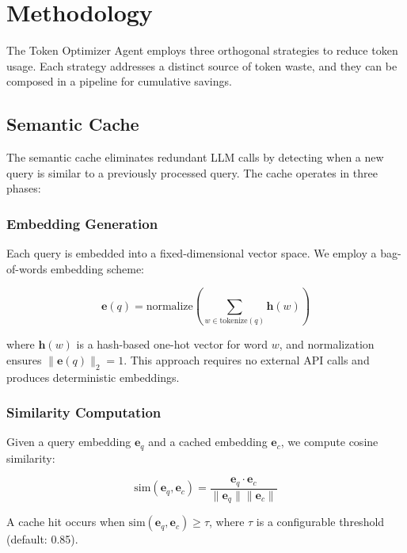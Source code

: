 \section{Methodology}
\label{sec:methodology}

The Token Optimizer Agent employs three orthogonal strategies to reduce token usage. Each strategy addresses a distinct source of token waste, and they can be composed in a pipeline for cumulative savings.

\subsection{Semantic Cache}

The semantic cache eliminates redundant LLM calls by detecting when a new query is similar to a previously processed query. The cache operates in three phases:

\subsubsection{Embedding Generation}

Each query is embedded into a fixed-dimensional vector space. We employ a bag-of-words embedding scheme:

\begin{equation}
    \mathbf{e}(q) = \text{normalize}\left(\sum_{w \in \text{tokenize}(q)} \mathbf{h}(w)\right)
\end{equation}

where $\mathbf{h}(w)$ is a hash-based one-hot vector for word $w$, and normalization ensures $\|\mathbf{e}(q)\|_2 = 1$. This approach requires no external API calls and produces deterministic embeddings.

\subsubsection{Similarity Computation}

Given a query embedding $\mathbf{e}_q$ and a cached embedding $\mathbf{e}_c$, we compute cosine similarity:

\begin{equation}
    \text{sim}(\mathbf{e}_q, \mathbf{e}_c) = \frac{\mathbf{e}_q \cdot \mathbf{e}_c}{\|\mathbf{e}_q\| \|\mathbf{e}_c\|}
\end{equation}

A cache hit occurs when $\text{sim}(\mathbf{e}_q, \mathbf{e}_c) \geq \tau$, where $\tau$ is a configurable threshold (default: 0.85).


